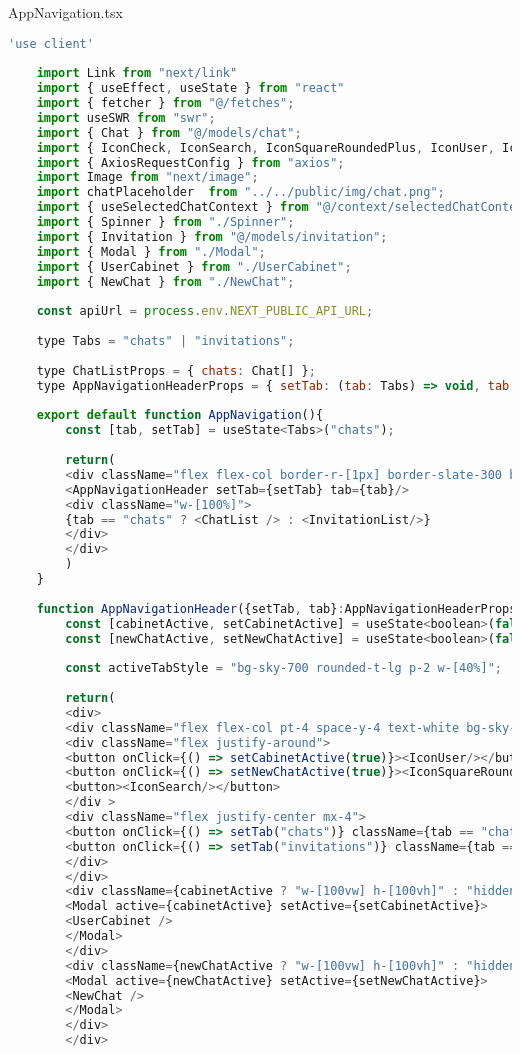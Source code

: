 AppNavigation.tsx
\begin{lstlisting}[language=javascript]
	'use client'
	
	import Link from "next/link"
	import { useEffect, useState } from "react"
	import { fetcher } from "@/fetches";
	import useSWR from "swr";
	import { Chat } from "@/models/chat";
	import { IconCheck, IconSearch, IconSquareRoundedPlus, IconUser, IconX } from "@tabler/icons-react";
	import { AxiosRequestConfig } from "axios";
	import Image from "next/image";
	import chatPlaceholder  from "../../public/img/chat.png";
	import { useSelectedChatContext } from "@/context/selectedChatContext";
	import { Spinner } from "./Spinner";
	import { Invitation } from "@/models/invitation";
	import { Modal } from "./Modal";
	import { UserCabinet } from "./UserCabinet";
	import { NewChat } from "./NewChat";
	
	const apiUrl = process.env.NEXT_PUBLIC_API_URL;
	
	type Tabs = "chats" | "invitations";
	
	type ChatListProps = { chats: Chat[] };
	type AppNavigationHeaderProps = { setTab: (tab: Tabs) => void, tab:  Tabs};
	
	export default function AppNavigation(){
		const [tab, setTab] = useState<Tabs>("chats");
		
		return(
		<div className="flex flex-col border-r-[1px] border-slate-300 border-solid min-w-[33%]">
		<AppNavigationHeader setTab={setTab} tab={tab}/>
		<div className="w-[100%]">
		{tab == "chats" ? <ChatList /> : <InvitationList/>}
		</div>
		</div>
		)
	}
	
	function AppNavigationHeader({setTab, tab}:AppNavigationHeaderProps){
		const [cabinetActive, setCabinetActive] = useState<boolean>(false);
		const [newChatActive, setNewChatActive] = useState<boolean>(false);
		
		const activeTabStyle = "bg-sky-700 rounded-t-lg p-2 w-[40%]";
		
		return(
		<div>
		<div className="flex flex-col pt-4 space-y-4 text-white bg-sky-600">
		<div className="flex justify-around">
		<button onClick={() => setCabinetActive(true)}><IconUser/></button>
		<button onClick={() => setNewChatActive(true)}><IconSquareRoundedPlus/></button>
		<button><IconSearch/></button>
		</div >
		<div className="flex justify-center mx-4">
		<button onClick={() => setTab("chats")} className={tab == "chats" ? activeTabStyle : " w-[40%]"}>Чаты</button>
		<button onClick={() => setTab("invitations")} className={tab == "invitations" ? activeTabStyle : " w-[40%]"}>Приглашения</button>
		</div>
		</div>
		<div className={cabinetActive ? "w-[100vw] h-[100vh]" : "hidden"}>
		<Modal active={cabinetActive} setActive={setCabinetActive}>
		<UserCabinet />
		</Modal>
		</div>
		<div className={newChatActive ? "w-[100vw] h-[100vh]" : "hidden"}>
		<Modal active={newChatActive} setActive={setNewChatActive}>
		<NewChat />
		</Modal>
		</div>
		</div>
		

\end{lstlisting}
